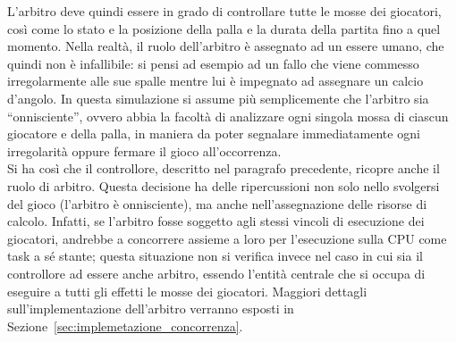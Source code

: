 L'arbitro deve quindi essere in grado di controllare tutte le mosse dei giocatori, così come lo stato e la posizione della palla e la durata della partita fino a quel momento. Nella realtà, il ruolo dell'arbitro è assegnato ad un essere umano, che quindi non è infallibile: si pensi ad esempio ad un fallo che viene commesso irregolarmente alle sue spalle mentre lui è impegnato ad assegnare un calcio d'angolo. In questa simulazione si assume più semplicemente che l'arbitro sia ``onnisciente'', ovvero abbia la facoltà di analizzare ogni singola mossa di ciascun giocatore e della palla, in maniera da poter segnalare immediatamente ogni irregolarità oppure fermare il gioco all'occorrenza.\\

Si ha così che il controllore, descritto nel paragrafo precedente, ricopre anche il ruolo di arbitro. Questa decisione ha delle ripercussioni non solo nello svolgersi del gioco (l'arbitro è onnisciente), ma anche nell'assegnazione delle risorse di calcolo. Infatti, se l'arbitro fosse soggetto agli stessi vincoli di esecuzione dei giocatori, andrebbe a concorrere assieme a loro per l'esecuzione sulla CPU come task a sé stante; questa situazione non si verifica invece nel caso in cui sia il controllore ad essere anche arbitro, essendo l'entità centrale che si occupa di eseguire a tutti gli effetti le mosse dei giocatori. Maggiori dettagli sull'implementazione dell'arbitro verranno esposti in Sezione~\ref{sec:implemetazione_concorrenza}.\\

